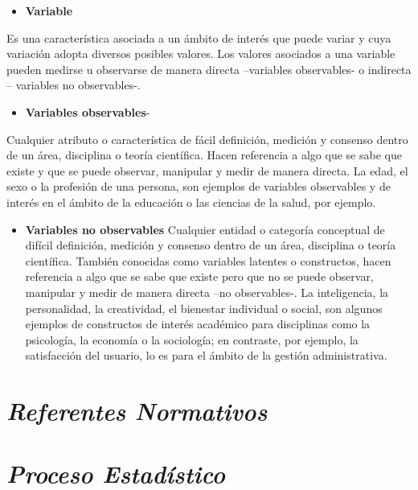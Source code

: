 \documentclass[
]{book}
\providecommand{\tightlist}{%
  \setlength{\itemsep}{0pt}\setlength{\parskip}{0pt}}
\begin{document}
\begin{itemize}
\tightlist
\item
  \textbf{Variable}
\end{itemize}

Es una característica asociada a un ámbito de interés que puede variar y cuya variación adopta diversos posibles valores. Los valores asociados a una variable pueden medirse u observarse de manera directa --variables observables- o indirecta -- variables no observables-.

\begin{itemize}
\tightlist
\item
  \textbf{Variables observables}-
\end{itemize}

Cualquier atributo o característica de fácil definición, medición y consenso dentro de un área, disciplina o teoría científica. Hacen referencia a algo que se sabe que existe y que se puede observar, manipular y medir de manera directa. La edad, el sexo o la profesión de una persona, son ejemplos de variables observables y de interés en el ámbito de la educación o las ciencias de la salud, por ejemplo.

\begin{itemize}
\tightlist
\item
  \textbf{Variables no observables}
  Cualquier entidad o categoría conceptual de difícil definición, medición y consenso dentro de un área, disciplina o teoría científica. También conocidas como variables latentes o constructos, hacen referencia a algo que se sabe que existe pero que no se puede observar, manipular y medir de manera directa --no observables-. La inteligencia, la personalidad, la creatividad, el bienestar individual o social, son algunos ejemplos de constructos de interés académico para disciplinas como la psicología, la economía o la sociología; en contraste, por ejemplo, la satisfacción del usuario, lo es para el ámbito de la gestión administrativa.
\end{itemize}

\hypertarget{referentes-normativos}{%
\chapter{\texorpdfstring{\textbf{\emph{Referentes Normativos}}}{Referentes Normativos}}\label{referentes-normativos}}

\hypertarget{proceso-estaduxedstico}{%
\chapter{\texorpdfstring{\textbf{\emph{Proceso Estadístico}}}{Proceso Estadístico}}\label{proceso-estaduxedstico}}
\end{document}
